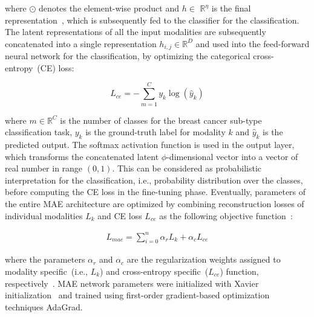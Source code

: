 \hspace*{3.5mm} where $\odot$ denotes the element-wise product and $h \in$ $\mathbb{R}^{\eta}$ is the final representation~\cite{mmdcae}, which is subsequently fed to the classifier for the classification. The latent representations of all the input modalities are subsequently concatenated into a single representation $h_{i,j} \in \mathbb{R}^{D}$ and used into the feed-forward neural network for the classification, by optimizing the categorical cross-entropy~(CE) loss: 

\begin{equation} 
    L_{ce}=-\sum_{m=1}^{C} y_{k} \log \left(\hat{y}_{k}\right)
\end{equation} 

\hspace*{3.5mm} where $m \in \mathbb{R}^{C}$ is the number of classes for the breast cancer sub-type classification task, $y_{k}$ is the ground-truth label for modality $k$ and $\hat{y}_{k}$ is the predicted output. The softmax activation function is used in the output layer, which transforms the concatenated latent $\phi$-dimensional vector into a vector of real number in range $\left(0,1\right)$. This can be considered as probabilistic interpretation for the classification, i.e., probability distribution over the classes, before computing the CE loss in the fine-tuning phase. 
Eventually, parameters of the entire MAE architecture are optimized by combining reconstruction losses of individual modalities ${L}_{k}$ and CE loss ${L}_{ce}$ as the following objective function~\cite{mmdcae}: 

\begin{align}
    L_{mae}=\sum_{i=0}^{n} \alpha_{r} {L}_{k}+\alpha_{c} {L}_{ce}
    \label{eq:sum}
\end{align}

\hspace*{3.5mm} where the parameters $\alpha_{r}$ and $\alpha_{c}$ are the regularization weights assigned to modality specific~(i.e., ${L}_{k}$) and cross-entropy specific~(${L}_{ce}$) function, respectively~\cite{mmdcae}. MAE network parameters were initialized with Xavier initialization~\cite{xavier} and trained using first-order gradient-based optimization techniques AdaGrad. 
